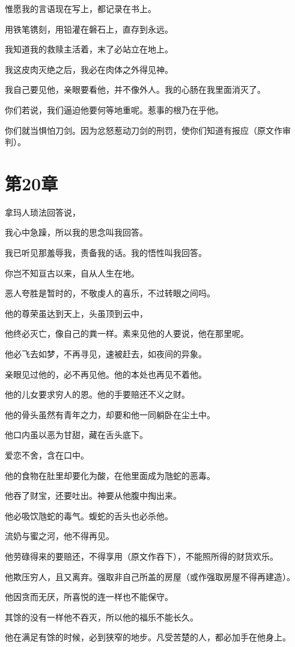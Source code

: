 \documentclass[12pt,oneside]{book}
\begin{document}
惟愿我的言语现在写上，都记录在书上。

用铁笔镌刻，用铅灌在磐石上，直存到永远。

我知道我的救赎主活着，末了必站立在地上。

我这皮肉灭绝之后，我必在肉体之外得见神。

我自己要见他，亲眼要看他，并不像外人。我的心肠在我里面消灭了。

你们若说，我们逼迫他要何等地重呢。惹事的根乃在乎他。

你们就当惧怕刀剑。因为忿怒惹动刀剑的刑罚，使你们知道有报应（原文作审判）。


\chapter{第20章}
拿玛人琐法回答说，

我心中急躁，所以我的思念叫我回答。

我已听见那羞辱我，责备我的话。我的悟性叫我回答。

你岂不知亘古以来，自从人生在地。

恶人夸胜是暂时的，不敬虔人的喜乐，不过转眼之间吗。

他的尊荣虽达到天上，头虽顶到云中，

他终必灭亡，像自己的粪一样。素来见他的人要说，他在那里呢。

他必飞去如梦，不再寻见，速被赶去，如夜间的异象。

亲眼见过他的，必不再见他。他的本处也再见不着他。

他的儿女要求穷人的恩。他的手要赔还不义之财。

他的骨头虽然有青年之力，却要和他一同躺卧在尘土中。

他口内虽以恶为甘甜，藏在舌头底下。

爱恋不舍，含在口中。

他的食物在肚里却要化为酸，在他里面成为虺蛇的恶毒。

他吞了财宝，还要吐出。神要从他腹中掏出来。

他必吸饮虺蛇的毒气。蝮蛇的舌头也必杀他。

流奶与蜜之河，他不得再见。

他劳碌得来的要赔还，不得享用（原文作吞下），不能照所得的财货欢乐。

他欺压穷人，且又离弃。强取非自己所盖的房屋（或作强取房屋不得再建造）。

他因贪而无厌，所喜悦的连一样也不能保守。

其馀的没有一样他不吞灭，所以他的福乐不能长久。

他在满足有馀的时候，必到狭窄的地步。凡受苦楚的人，都必加手在他身上。
\end{document}
